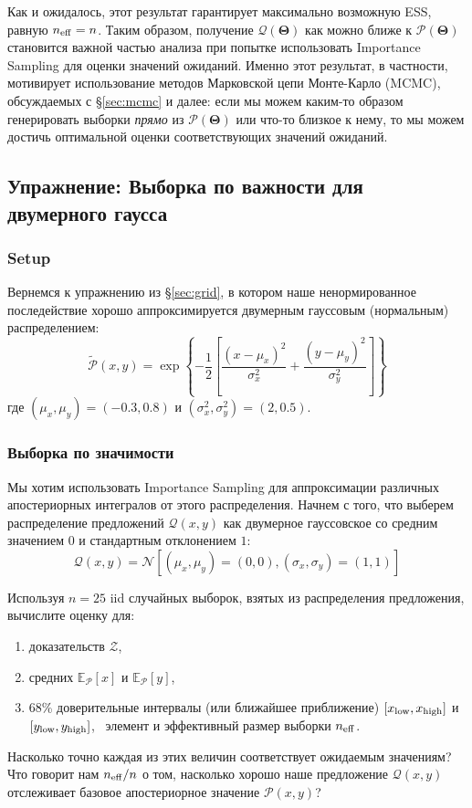 \documentclass[12pt, titlepage]{article}
\newcommand{\Normal}[2]{\ensuremath{\mathcal{N}\left[{#1}, {#2} \right]}} %
\newcommand{\meanwrt}[2]{\ensuremath{\mathbb{E}_{{#2}}\left[{#1}\right]}}
\newcommand{\params}{\ensuremath{\boldsymbol\Theta}}
\newcommand{\posterior}{\ensuremath{\mathcal{P}}}
\newcommand{\proposal}{\ensuremath{\mathcal{Q}}}
\newcommand{\evidence}{\ensuremath{\mathcal{Z}}}
\begin{document}
Как и ожидалось, этот результат гарантирует максимально возможную ESS, равную $n_{\rm eff} = n$. Таким образом, получение $\proposal(\params)$ как можно ближе к $\posterior(\params)$ становится важной частью анализа при попытке использовать Importance Sampling для оценки значений ожиданий. Именно этот результат, в частности, мотивирует использование методов Марковской цепи Монте-Карло (MCMC), обсуждаемых с \S\ref{sec:mcmc} и далее: если мы можем каким-то образом генерировать выборки \textit{прямо} из $\posterior(\params)$ или что-то близкое к нему, то мы можем достичь оптимальной оценки соответствующих значений ожиданий.

\subsection*{Упражнение: Выборка по важности для двумерного гаусса} 
\label{exercise:importance}

\subsubsection*{Setup}

Вернемся к упражнению из \S\ref{sec:grid}, в котором наше ненормированное последействие хорошо аппроксимируется двумерным гауссовым (нормальным) распределением:
\begin{equation*}
    \tilde{\posterior}(x,y) 
    = \exp\left\{-\frac{1}{2}\left[\frac{(x-\mu_x)^2}{\sigma_x^2}
    + \frac{(y-\mu_y)^2}{\sigma_y^2}\right]\right\}
\end{equation*}
где $(\mu_x,\mu_y)=(-0.3,0.8)$ и $(\sigma_x^2,\sigma_y^2)=(2,0.5)$.

\subsubsection*{Выборка по значимости}

Мы хотим использовать Importance Sampling для аппроксимации различных апостериорных интегралов от этого распределения. Начнем с того, что выберем распределение предложений $\proposal(x,y)$ как двумерное гауссовское со средним значением $0$ и стандартным отклонением $1$:
\begin{equation*}
    \proposal(x,y) = \Normal{(\mu_x,\mu_y)=(0,0)}{(\sigma_x,\sigma_y)=(1,1)}
\end{equation*}

Используя $n=25$ iid случайных выборок, взятых из распределения предложения, вычислите оценку для:
\begin{enumerate}
	\item доказательств $\evidence$,
	\item средних $\meanwrt{x}{\posterior}$
	и $\meanwrt{y}{\posterior}$,
	\item 68\% доверительные интервалы (или ближайшее приближение) 
	$[x_{\rm low}, x_{\rm high}]$ и $[y_{\rm low}, y_{\rm high}]$,
	\ элемент и эффективный размер выборки $n_{\rm eff}$.
\end{enumerate}
Насколько точно каждая из этих величин соответствует ожидаемым значениям? Что говорит нам $n_{\rm eff}/n$ о том, насколько хорошо наше предложение $\proposal(x,y)$ отслеживает базовое апостериорное значение $\posterior(x,y)$?
\end{document}
